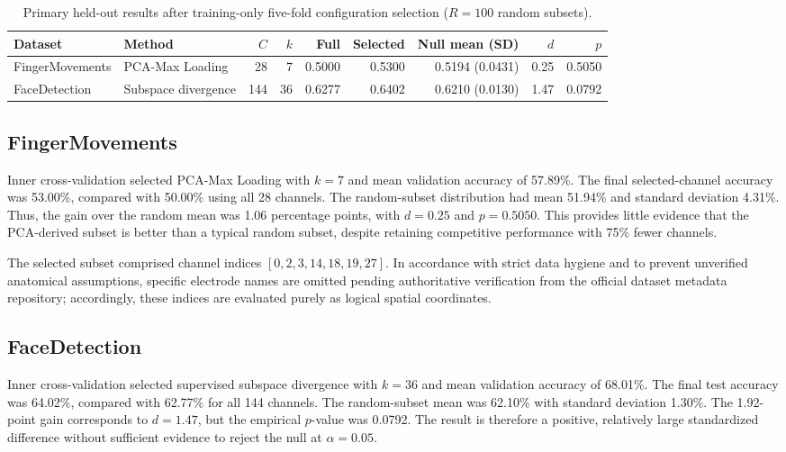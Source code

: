\begin{table}[htbp]
\centering
\caption{Primary held-out results after training-only five-fold configuration selection ($R=100$ random subsets).}
\label{tab:primary-results}
\small
\begin{tabularx}{\textwidth}{@{}Y Y r r r r r r r@{}}
\toprule
Dataset & Method & $C$ & $k$ & Full & Selected & Null mean (SD) & $d$ & $p$\\
\midrule
FingerMovements & PCA-Max Loading & 28 & 7 & 0.5000 & 0.5300 & 0.5194 (0.0431) & 0.25 & 0.5050\\
FaceDetection & Subspace divergence & 144 & 36 & 0.6277 & 0.6402 & 0.6210 (0.0130) & 1.47 & 0.0792\\
\bottomrule
\end{tabularx}
\end{table}

\subsection{FingerMovements}
Inner cross-validation selected PCA-Max Loading with $k=7$ and mean validation accuracy of 57.89\%. The final selected-channel accuracy was 53.00\%, compared with 50.00\% using all 28 channels. The random-subset distribution had mean 51.94\% and standard deviation 4.31\%. Thus, the gain over the random mean was 1.06 percentage points, with $d=0.25$ and $p=0.5050$. This provides little evidence that the PCA-derived subset is better than a typical random subset, despite retaining competitive performance with 75\% fewer channels.

The selected subset comprised channel indices $[0, 2, 3, 14, 18, 19, 27]$. In accordance with strict data hygiene and to prevent unverified anatomical assumptions, specific electrode names are omitted pending authoritative verification from the official dataset metadata repository; accordingly, these indices are evaluated purely as logical spatial coordinates.

\subsection{FaceDetection}
Inner cross-validation selected supervised subspace divergence with $k=36$ and mean validation accuracy of 68.01\%. The final test accuracy was 64.02\%, compared with 62.77\% for all 144 channels. The random-subset mean was 62.10\% with standard deviation 1.30\%. The 1.92-point gain corresponds to $d=1.47$, but the empirical $p$-value was 0.0792. The result is therefore a positive, relatively large standardized difference without sufficient evidence to reject the null at $\alpha=0.05$.

